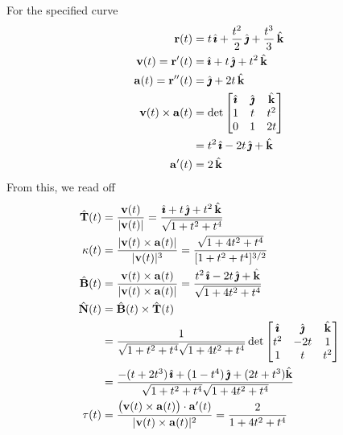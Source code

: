 \begin{solution}
For the specified curve
\begin{align*}
\mathbf{r}(t)&=t\,\hat{\pmb{\imath}} + \frac{t^2}{2}\,\hat{\pmb{\jmath}} + \frac{t^3}{3}\,\hat{\mathbf{k}}\\
\mathbf{v}(t)=\mathbf{r}'(t)&= \hat{\pmb{\imath}} + t\,\hat{\pmb{\jmath}} + t^2\,\hat{\mathbf{k}} \\
\mathbf{a}(t)=\mathbf{r}''(t)&= \hat{\pmb{\jmath}} + 2t\,\hat{\mathbf{k}}  \\
\mathbf{v}(t)\times\mathbf{a}(t) 
&=\det\left[\begin{matrix}
                 \hat{\pmb{\imath}}  & \hat{\pmb{\jmath}} &  \hat{\mathbf{k}} \\
                  1   &  t  &  t^2 \\
                  0   &  1  &  2t
       \end{matrix}\right] \\
& = t^2\,\hat{\pmb{\imath}}-2t\,\hat{\pmb{\jmath}}+\hat{\mathbf{k}}\\
\mathbf{a}'(t)&=  2\,\hat{\mathbf{k}}  
\end{align*}
From this, we read off
\begin{align*}
\hat{\mathbf{T}}(t)&=\frac{\mathbf{v}(t)}{|\mathbf{v}(t)|}
        =\frac{\hat{\pmb{\imath}} + t\,\hat{\pmb{\jmath}} + t^2\,\hat{\mathbf{k}}}{\sqrt{1+t^2+t^4}}\\
\kappa(t)&=\frac{|\mathbf{v}(t)\times\mathbf{a}(t)|}{|\mathbf{v}(t)|^3}
       =\frac{\sqrt{1+4t^2+t^4}}{[1+t^2+t^4]^{3/2}}\\
\hat{\mathbf{B}}(t)&=\frac{\mathbf{v}(t)\times\mathbf{a}(t)}{|\mathbf{v}(t)\times\mathbf{a}(t)|}
       =\frac{t^2\,\hat{\pmb{\imath}}-2t\,\hat{\pmb{\jmath}}+\hat{\mathbf{k}}}{\sqrt{1+4t^2+t^4}}\\
\hat{\mathbf{N}}(t)&=\hat{\mathbf{B}}(t)\times\hat{\mathbf{T}}(t) \\
       &= \frac{1}{\sqrt{1+t^2+t^4}\sqrt{1+4t^2+t^4}}\det\left[\begin{matrix}
                 \hat{\pmb{\imath}}  & \hat{\pmb{\jmath}} &  \hat{\mathbf{k}} \\
                  t^2 & -2t &  1 \\
                  1   &  t  &  t^2
       \end{matrix}\right] \\ 
       &=\frac{-(t+2t^3)\,\hat{\pmb{\imath}}+(1-t^4)\,\hat{\pmb{\jmath}}+(2t+t^3)\hat{\mathbf{k}}}
            {\sqrt{1+t^2+t^4}\sqrt{1+4t^2+t^4}}\\
\tau(t)&=\frac{\big(\mathbf{v}(t)\times\mathbf{a}(t)\big)\cdot\mathbf{a}'(t)}{|\mathbf{v}(t)\times\mathbf{a}(t)|^2}
       =\frac{2}{1+4t^2+t^4}
\end{align*}
\end{solution}

